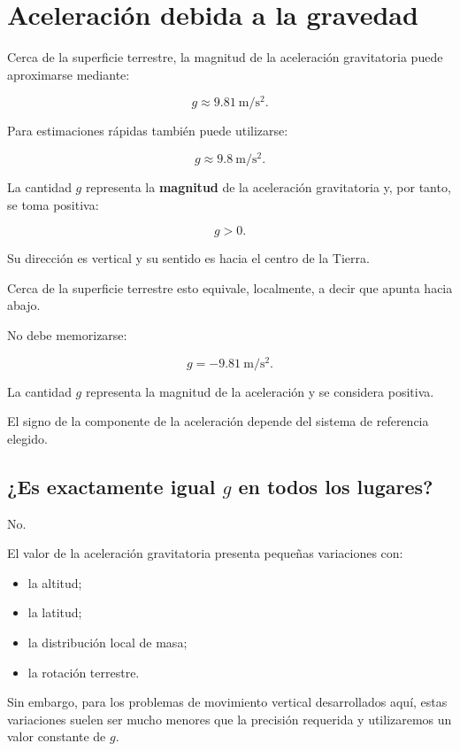 \section{Aceleración debida a la gravedad}

Cerca de la superficie terrestre, la magnitud de la aceleración gravitatoria puede aproximarse mediante:

\[ \boxed{g\approx\SI{9.81}{\meter\per\second\squared}}. \]

Para estimaciones rápidas también puede utilizarse:

\[ g\approx\SI{9.8}{\meter\per\second\squared}. \]

La cantidad \(g\) representa la \textbf{magnitud} de la aceleración gravitatoria y, por tanto, se toma positiva:

\[ g>0. \]

Su dirección es vertical y su sentido es hacia el centro de la Tierra.

Cerca de la superficie terrestre esto equivale, localmente, a decir que apunta hacia abajo.

\begin{advertencia}[El signo de \(g\)]
No debe memorizarse:

\[ g=-\SI{9.81}{\meter\per\second\squared}. \]

La cantidad \(g\) representa la magnitud de la aceleración y se considera positiva.

El signo de la componente de la aceleración depende del sistema de referencia elegido.
\end{advertencia}


\subsection{¿Es exactamente igual \(g\) en todos los lugares?}

No.

El valor de la aceleración gravitatoria presenta pequeñas variaciones con:

\begin{itemize}
    \item la altitud;
    \item la latitud;
    \item la distribución local de masa;
    \item la rotación terrestre.
\end{itemize}

Sin embargo, para los problemas de movimiento vertical desarrollados aquí, estas variaciones suelen ser mucho menores que la precisión requerida y utilizaremos un valor constante de \(g\).


